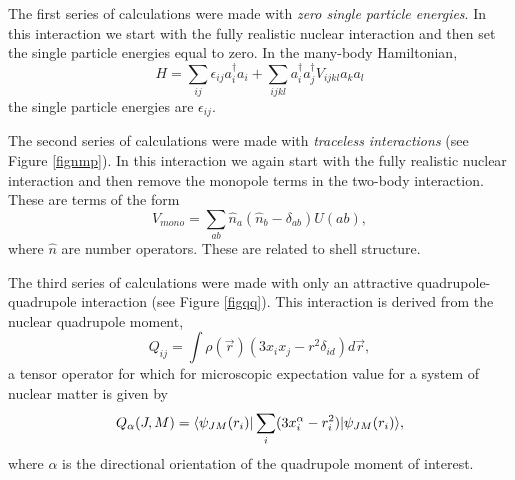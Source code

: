 The first series of calculations were made with \textit{zero single particle energies}.
In this interaction we start with the fully realistic nuclear
interaction and then set the single particle energies equal 
to zero. In the many-body Hamiltonian,
\begin{equation}
    H = \sum_{ij} \epsilon_{ij}a^\dagger_ia_i + \sum_{ijkl} a^\dagger_ia^\dagger_jV_{ijkl}a_ka_l
\end{equation}
the single particle energies are $\epsilon_{ij}$.

The second series of calculations were made with \textit{traceless interactions} (see Figure \ref{fignmp}).
In this interaction we again start with the fully realistic nuclear
interaction and then remove the monopole terms in the two-body 
interaction. These are terms of the form\cite{Caurier}
\begin{equation}
    V_{mono} = \sum_{ab} \hat{n}_a(\hat{n}_b-\delta_{ab})U(ab),
\end{equation}
where $\hat{n}$ are number operators. These are related to shell structure.

The third series of calculations were made with only an attractive
quadrupole-quadrupole interaction\cite{Schuck} (see Figure \ref{figqq}). This interaction is derived from
the nuclear quadrupole moment\cite{Wong,Schuck},
\begin{equation}
    Q_{ij}=\int \rho(\vec{r})(3x_ix_j-r^2\delta_{id})d\vec{r},
\end{equation}
a tensor operator for which for microscopic expectation value for a system
of nuclear matter is given by\cite{Heyde,Schuck}
\begin{equation}
    Q_\alpha(J,M) = \langle \psi_{JM}(r_i)|\sum_i(3x^\alpha_i-r_i^2)|\psi_{JM}(r_i)\rangle,
\end{equation}
where $\alpha$ is the directional orientation of the quadrupole moment of 
interest.

